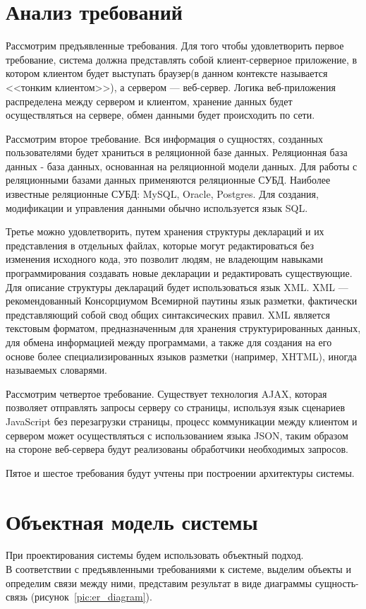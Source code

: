 \documentclass[14pt,a4paper]{reportmod}
\begin{document}
\section{Анализ требований}
Рассмотрим предъявленные требования. Для того чтобы удовлетворить первое требование, система должна представлять собой клиент-серверное приложение, в котором клиентом будет выступать браузер(в данном контексте называется  <<тонким клиентом>>), а сервером --- веб-сервер. Логика веб-приложения распределена между сервером и клиентом, хранение данных будет осуществляться на сервере, обмен данными будет происходить по сети.


Рассмотрим второе требование. Вся информация о сущностях, созданных пользователями будет храниться в реляционной базе данных. Реляционная база данных - база данных, основанная на реляционной модели данных. Для работы с реляционными базами данных применяются реляционные СУБД. Наиболее известные реляционные СУБД: MySQL, Oracle, Postgres. Для создания, модификации и управления данными обычно используется язык SQL.

Третье можно удовлетворить, путем хранения структуры деклараций и их представления в отдельных файлах, которые могут редактироваться без изменения исходного кода, это позволит людям, не владеющим навыками программирования создавать новые декларации и редактировать существующие. Для описание структуры деклараций будет использоваться язык XML. XML --- рекомендованный Консорциумом Всемирной паутины язык разметки, фактически представляющий собой свод общих синтаксических правил. XML является текстовым форматом, предназначенным для хранения структурированных данных, для обмена информацией между программами, а также для создания на его основе более специализированных языков разметки (например, XHTML), иногда называемых словарями.

Рассмотрим четвертое требование. Существует технология AJAX, которая позволяет отправлять запросы серверу со страницы, используя язык сценариев JavaScript без перезагрузки страницы, процесс коммуникации между клиентом и сервером может осуществляться с использованием языка JSON, таким образом на стороне веб-сервера будут реализованы обработчики необходимых запросов.


Пятое и шестое требования будут учтены при построении архитектуры системы.

\section{Объектная модель системы}
При проектирования системы будем использовать объектный подход.\\
В соответствии с предъявленными требованиями к системе, выделим объекты и определим связи между ними, представим результат в виде диаграммы сущность-связь (рисунок~\ref{pic:er_diagram}).
\end{document}
